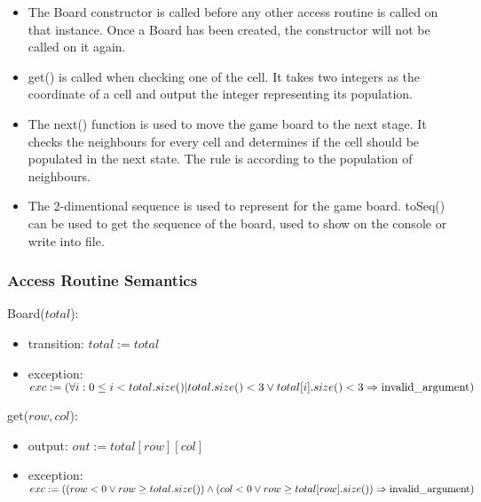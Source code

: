 \documentclass[12pt]{article}
\begin{document}
\begin{itemize}
\item The Board constructor is called before any other
access routine is called on that instance. Once a Board has been created, the constructor will not be called on it again.

\item get() is called when checking one of the cell. It takes two integers as the coordinate of a cell and output the integer representing its population.

\item The next() function is used to move the game board to the next stage. It checks the neighbours for every cell and determines if the cell should be populated in the next state. The rule is according to the population of neighbours.

\item The 2-dimentional sequence is used to represent for the game board. toSeq() can be used to get the sequence of the board, used to show on the console or write into file.
\end{itemize}

\subsubsection* {Access Routine Semantics}



\noindent Board($total$):
\begin{itemize}
\item transition: $total := total$
\item exception: $exc := (\forall i: 0 \leq i < total.size()|total.size() < 3 \lor total[i].size() < 3 \Rightarrow {\rm invalid\_argument})$
\end{itemize}

\noindent get($row, col$):
\begin{itemize}
\item output:
$out := total[row][col]$
\item exception: $exc := ((row< 0 \lor row  \geq total.size())\land (col<0 \lor row\geq total[row].size()) \Rightarrow {\rm invalid\_argument})$
\end{itemize}
\end{document}
